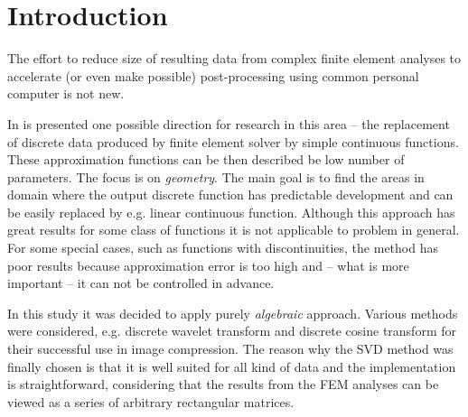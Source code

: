 \section{Introduction}
\label{sec:introduction}


The effort to reduce size of resulting data from complex finite element analyses to accelerate (or even make possible) post-processing using common personal computer is not new.


In \cite{Benes2016} is presented one possible direction for research in this area -- the replacement of discrete data produced by finite element solver by simple continuous functions. These approximation functions can be then described be low number of parameters. The focus is on \textit{geometry}. The main goal is to find the areas in domain where the output discrete function has predictable development and can be easily replaced by e.g. linear continuous function. Although this approach has great results for some class of functions it is not applicable to problem in general. For some special cases, such as functions with discontinuities, the method has poor results because approximation error is too high and -- what is more important -- it can not be controlled in advance.

In this study it was decided to apply purely \textit{algebraic} approach. Various methods were considered, e.g. discrete wavelet transform \cite{Lui2001} and discrete cosine transform \cite{Watson1994} for their successful use in image compression. The reason why the SVD method was finally chosen is that it is well suited for all kind of data and the implementation is straightforward, considering that the results from the FEM analyses can be viewed as a series of arbitrary rectangular matrices.


